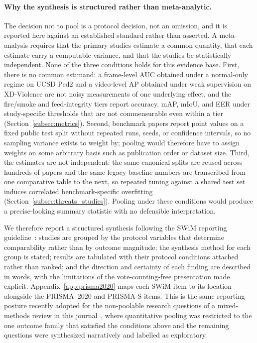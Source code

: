 \documentclass[10pt,a4paper]{article}
\begin{document}
\paragraph{Why the synthesis is structured rather than meta-analytic.} The decision not to pool is a protocol decision, not an omission, and it is reported here against an established standard rather than asserted. A meta-analysis requires that the primary studies estimate a common quantity, that each estimate carry a computable variance, and that the studies be statistically independent. None of the three conditions holds for this evidence base. First, there is no common estimand: a frame-level AUC obtained under a normal-only regime on UCSD Ped2 and a video-level AP obtained under weak supervision on XD-Violence are not noisy measurements of one underlying effect, and the fire/smoke and feed-integrity tiers report accuracy, mAP, mIoU, and EER under study-specific thresholds that are not commensurable even within a tier (Section~\ref{subsec:metrics}). Second, benchmark papers report point values on a fixed public test split without repeated runs, seeds, or confidence intervals, so no sampling variance exists to weight by; pooling would therefore have to assign weights on some arbitrary basis such as publication order or dataset size. Third, the estimates are not independent: the same canonical splits are reused across hundreds of papers and the same legacy baseline numbers are transcribed from one comparative table to the next, so repeated tuning against a shared test set induces correlated benchmark-specific overfitting (Section~\ref{subsec:threats_studies}). Pooling under these conditions would produce a precise-looking summary statistic with no defensible interpretation.

We therefore report a structured synthesis following the SWiM reporting guideline~\citep{campbell2020swim}: studies are grouped by the protocol variables that determine comparability rather than by outcome magnitude; the synthesis method for each group is stated; results are tabulated with their protocol conditions attached rather than ranked; and the direction and certainty of each finding are described in words, with the limitations of the vote-counting-free presentation made explicit. Appendix~\ref{app:prisma2020} maps each SWiM item to its location alongside the PRISMA~2020 and PRISMA-S items. This is the same reporting posture recently adopted for the non-poolable research questions of a mixed-methods review in this journal~\citep{boolzen2026evidence}, where quantitative pooling was restricted to the one outcome family that satisfied the conditions above and the remaining questions were synthesized narratively and labelled as exploratory.
\end{document}
